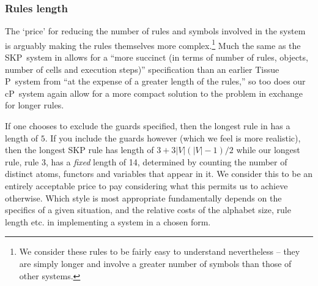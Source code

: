 \subsubsection{Rules length}
The `price' for reducing the number of rules and symbols involved in the system is arguably making the rules themselves more complex.\footnote{We consider these rules to be fairly easy to understand nevertheless -- they are simply longer and involve a greater number of symbols than those of other systems.}  Much the same as the SKP~system in \cite{Gheorghe2013} allows for a ``more succinct (in terms of number of rules, objects, number of cells and execution steps)'' specification than an earlier Tissue P~system from \cite{Diaz-Pernil2008} ``at the expense of a greater length of the rules,'' so too does our cP~system again allow for a more compact solution to the problem in exchange for longer rules.

If one chooses to exclude the guards specified, then the longest rule in \cite{Gheorghe2013} has a length of \(5\).  If you include the guards however (which we feel is more realistic), then the longest SKP rule has length of \(3 + 3|V|(|V| - 1)/2\) while our longest rule, rule 3, has a \emph{fixed} length of 14, determined by counting the number of distinct atoms, functors and variables that appear in it.  We consider this to be an entirely acceptable price to pay considering what this permits us to achieve otherwise.  Which style is most appropriate fundamentally depends on the specifics of a given situation, and the relative costs of the alphabet size, rule length etc. in implementing a system in a chosen form.